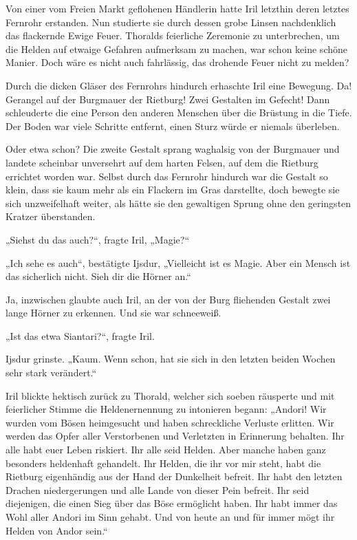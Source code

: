 Von einer vom Freien Markt geflohenen Händlerin hatte Iril letzthin deren letztes Fernrohr erstanden. Nun studierte sie durch dessen grobe Linsen nachdenklich das flackernde Ewige Feuer. Thoralds feierliche Zeremonie zu unterbrechen, um die Helden auf etwaige Gefahren aufmerksam zu machen, war schon keine schöne Manier. Doch wäre es nicht auch fahrlässig, das drohende Feuer nicht zu melden?

Durch die dicken Gläser des Fernrohrs hindurch erhaschte Iril eine Bewegung. Da! Gerangel auf der Burgmauer der Rietburg! Zwei Gestalten im Gefecht! Dann schleuderte die eine Person den anderen Menschen über die Brüstung in die Tiefe. Der Boden war viele Schritte entfernt, einen Sturz würde er niemals überleben.

Oder etwa schon? Die zweite Gestalt sprang waghalsig von der Burgmauer und landete scheinbar unversehrt auf dem harten Felsen, auf dem die Rietburg errichtet worden war. Selbst durch das Fernrohr hindurch war die Gestalt so klein, dass sie kaum mehr als ein Flackern im Gras darstellte, doch bewegte sie sich unzweifelhaft weiter, als hätte sie den gewaltigen Sprung ohne den geringsten Kratzer überstanden.

„Siehst du das auch?“, fragte Iril, „Magie?“

„Ich sehe es auch“, bestätigte Ijsdur, „Vielleicht ist es Magie. Aber ein Mensch ist das sicherlich nicht. Sieh dir die Hörner an.“

Ja, inzwischen glaubte auch Iril, an der von der Burg fliehenden Gestalt zwei lange Hörner zu erkennen. Und sie war schneeweiß.

„Ist das etwa Siantari?“, fragte Iril.

Ijsdur grinste. „Kaum. Wenn schon, hat sie sich in den letzten beiden Wochen sehr stark verändert.“

Iril blickte hektisch zurück zu Thorald, welcher sich soeben räusperte und mit feierlicher Stimme die Heldenernennung zu intonieren begann: „Andori! Wir wurden vom Bösen heimgesucht und haben schreckliche Verluste erlitten. Wir werden das Opfer aller Verstorbenen und Verletzten in Erinnerung behalten. Ihr alle habt euer Leben riskiert. Ihr alle seid Helden. Aber manche haben ganz besonders heldenhaft gehandelt. Ihr Helden, die ihr vor mir steht, habt die Rietburg eigenhändig aus der Hand der Dunkelheit befreit. Ihr habt den letzten Drachen niedergerungen und alle Lande von dieser Pein befreit. Ihr seid diejenigen, die einen Sieg über das Böse ermöglicht haben. Ihr habt immer das Wohl aller Andori im Sinn gehabt. Und von heute an und für immer mögt ihr Helden von Andor sein.“

